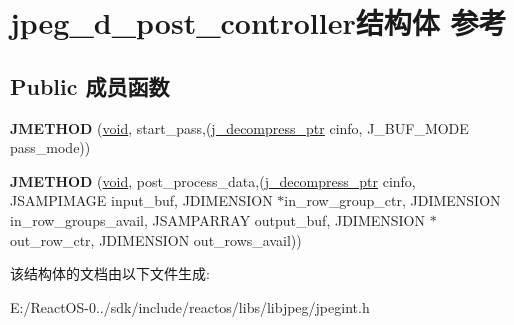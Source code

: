 \hypertarget{structjpeg__d__post__controller}{}\section{jpeg\+\_\+d\+\_\+post\+\_\+controller结构体 参考}
\label{structjpeg__d__post__controller}
\subsection*{Public 成员函数}
\begin{DoxyCompactItemize}
\item 
\mbox{\label{structjpeg__d__post__controller_a349b2ff7508568d13a9294f3e79163aa}} 
{\bfseries J\+M\+E\+T\+H\+OD} (\hyperlink{interfacevoid}{void}, start\+\_\+pass,(\hyperlink{structjpeg__decompress__struct}{j\+\_\+decompress\+\_\+ptr} cinfo, J\+\_\+\+B\+U\+F\+\_\+\+M\+O\+DE pass\+\_\+mode))
\item 
\mbox{\label{structjpeg__d__post__controller_adb337adcfe3a314ceac4b626a73d87c3}} 
{\bfseries J\+M\+E\+T\+H\+OD} (\hyperlink{interfacevoid}{void}, post\+\_\+process\+\_\+data,(\hyperlink{structjpeg__decompress__struct}{j\+\_\+decompress\+\_\+ptr} cinfo, J\+S\+A\+M\+P\+I\+M\+A\+GE input\+\_\+buf, J\+D\+I\+M\+E\+N\+S\+I\+ON $\ast$in\+\_\+row\+\_\+group\+\_\+ctr, J\+D\+I\+M\+E\+N\+S\+I\+ON in\+\_\+row\+\_\+groups\+\_\+avail, J\+S\+A\+M\+P\+A\+R\+R\+AY output\+\_\+buf, J\+D\+I\+M\+E\+N\+S\+I\+ON $\ast$out\+\_\+row\+\_\+ctr, J\+D\+I\+M\+E\+N\+S\+I\+ON out\+\_\+rows\+\_\+avail))
\end{DoxyCompactItemize}


该结构体的文档由以下文件生成\+:\begin{DoxyCompactItemize}
\item 
E\+:/\+React\+O\+S-\/0../sdk/include/reactos/libs/libjpeg/jpegint.\+h\end{DoxyCompactItemize}
